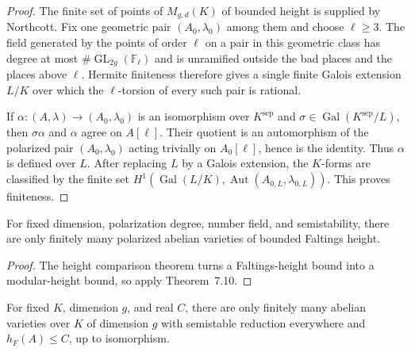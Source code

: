\begin{proof}

The finite set of points of $M_{g,d}(K)$ of bounded height is supplied by
Northcott.  Fix one geometric pair $(A_0,\lambda_0)$ among them and choose
$\ell\ge3$.  The field generated by the points of order $\ell$ on a pair in
this geometric class has degree at most
$\#\operatorname{GL}_{2g}(\mathbb F_\ell)$ and is unramified outside the
bad places and the places above $\ell$.  Hermite finiteness therefore gives a
single finite Galois extension $L/K$ over which the $\ell$-torsion of every
such pair is rational.

If $\alpha:(A,\lambda)\to(A_0,\lambda_0)$ is an isomorphism over
$K^{\mathrm{sep}}$ and $\sigma\in\operatorname{Gal}(K^{\mathrm{sep}}/L)$,
then $\sigma\alpha$ and $\alpha$ agree on $A[\ell]$.  Their quotient is an
automorphism of the polarized pair $(A_0,\lambda_0)$ acting trivially on
$A_0[\ell]$, hence is the identity.  Thus $\alpha$ is defined over $L$.
After replacing $L$ by a Galois extension, the $K$-forms are classified by
the finite set
$H^1(\operatorname{Gal}(L/K),\operatorname{Aut}(A_{0,L},\lambda_{0,L}))$.
This proves finiteness.

\end{proof}


\begin{corollary}
\label{cor:milne-unpolarized-height-consequence}

For fixed dimension, polarization degree, number field, and semistability,
there are only finitely many polarized abelian varieties of bounded Faltings
height.
\end{corollary}

\begin{proof}

The height comparison theorem turns a Faltings-height bound into a modular-height
bound, so apply Theorem~7.10.

\end{proof}


\begin{corollary}
\label{cor:milne-semistable-unpolarized-finiteness}

For fixed $K$, dimension $g$, and real $C$, there are only finitely many
abelian varieties over $K$ of dimension $g$ with semistable reduction everywhere
and $h_F(A)\le C$, up to isomorphism.
\end{corollary}

